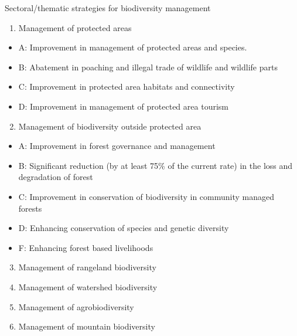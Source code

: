\documentclass[
  ignorenonframetext,
  aspectratio=169]{beamer}
\providecommand{\tightlist}{%
  \setlength{\itemsep}{0pt}\setlength{\parskip}{0pt}}
\begin{document}
\begin{frame}{Sectoral/thematic strategies for biodiversity management}
\protect\hypertarget{sectoralthematic-strategies-for-biodiversity-management}{}
\footnotesize

\begin{enumerate}
\tightlist
\item
  Management of protected areas
\end{enumerate}

\begin{itemize}
\tightlist
\item
  A: Improvement in management of protected areas and species.
\item
  B: Abatement in poaching and illegal trade of wildlife and wildlife
  parts
\item
  C: Improvement in protected area habitats and connectivity
\item
  D: Improvement in management of protected area tourism
\end{itemize}

\begin{enumerate}
\setcounter{enumi}{1}
\tightlist
\item
  Management of biodiversity outside protected area
\end{enumerate}

\begin{itemize}
\tightlist
\item
  A: Improvement in forest governance and management
\item
  B: Significant reduction (by at least 75\% of the current rate) in the
  loss and degradation of forest
\item
  C: Improvement in conservation of biodiversity in community managed
  forests
\item
  D: Enhancing conservation of species and genetic diversity
\item
  F: Enhancing forest based livelihoods
\end{itemize}

\begin{enumerate}
\setcounter{enumi}{2}
\tightlist
\item
  Management of rangeland biodiversity
\item
  Management of watershed biodiversity
\item
  Management of agrobiodiversity
\item
  Management of mountain biodiversity
\end{enumerate}
\end{frame}
\end{document}
